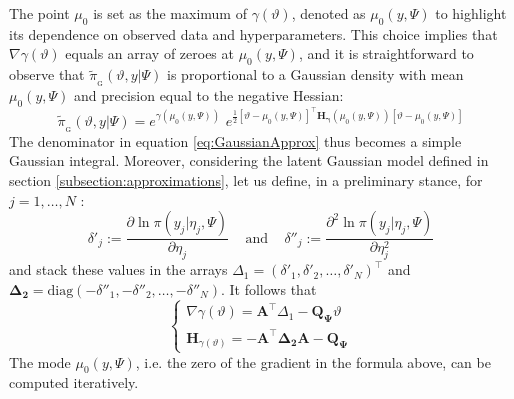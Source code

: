 \documentclass[openany, 11pt, oneside]{book}
\begin{document}
The point $\mu_0$ is set as the maximum of $\gamma(\vartheta)$,  denoted as $\mu_0(y, \Psi)$ to highlight its dependence on observed data and hyperparameters.  This choice implies that $\nabla \gamma(\vartheta)$ equals an array of zeroes at $\mu_0(y, \Psi)$, and it is straightforward to observe that $\tilde{\pi}_\mathrm{_G}(\vartheta, y \vert \Psi)$ is proportional to a Gaussian density with mean $\mu_0(y, \Psi)$ and precision equal to the negative Hessian:
\begin{equation}
\tilde{\pi}_\mathrm{_G}(\vartheta, y \vert \Psi) =
e^{\displaystyle{\gamma\left(\mu_0(y, \Psi)\right)}}  \,\,  e^{\displaystyle{
\tfrac{1}{2}[\vartheta - \mu_0(y, \Psi)]^\top
\boldsymbol{H_\gamma}(\mu_0(y, \Psi))
[\vartheta - \mu_0(y, \Psi)]
}}
\label{eq:apprG}
\end{equation}
The denominator in equation \ref{eq:GaussianApprox} thus becomes a simple Gaussian integral. Moreover, considering the latent Gaussian model defined in section \ref{subsection:approximations}, let us define, in a preliminary stance, for $j = 1, \dots, N$ :
%
$$
\delta'_j :=\frac{\partial \ln \pi(y_j \vert \eta_j, \Psi)}{\partial \eta_j} \quad \, \text{and} \, \quad
\delta''_j :=\frac{\partial^2 \ln \pi(y_j \vert \eta_j, \Psi)}{\partial \eta_j^2} 
$$
%
and stack these values in the arrays $\Delta_1=\left(\delta'_1, \delta'_2, \dots, \delta'_N \right)^\top$ and $\boldsymbol{\Delta_2} = \mathrm{diag}\left( -\delta''_1, -\delta''_2, \dots,- \delta''_N \right)$. It follows that
%
$$
\left \{ \begin{array}{ll}
\nabla \gamma(\vartheta) = \boldsymbol{A}^\top\Delta_1 -\boldsymbol{Q_\Psi} \vartheta \\
\boldsymbol{H}_{\gamma(\vartheta)} = -\boldsymbol{A}^\top \boldsymbol{\Delta_2 A} - \boldsymbol{Q_\Psi}
\end{array} \right.
$$
%
The mode $\mu_0 \left( y, \Psi \right)$, i.e. the zero of the gradient in the formula above, can be computed iteratively. 
\end{document}
